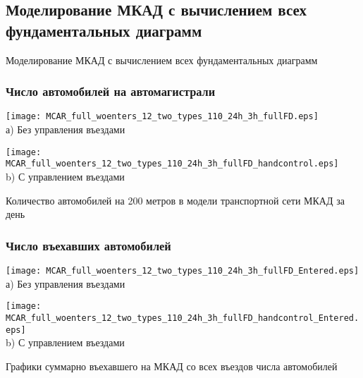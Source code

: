 \subsection{Моделирование МКАД с вычислением всех фундаментальных диаграмм}
\begin{frame}
    \begin{center}
        \Huge
        Моделирование МКАД с вычислением всех фундаментальных диаграмм
    \end{center}
\end{frame}
\begin{frame}
    \frametitle{Число автомобилей на автомагистрали}
    \centering
    \begin{minipage}[b]{0.49\textwidth}
        \centering
        \texttt{[image: MCAR\_full\_woenters\_12\_two\_types\_110\_24h\_3h\_fullFD.eps]}  \\ а) Без управления въездами
    \end{minipage}
    \hfill
    \begin{minipage}[b]{0.49\textwidth}
        \centering
        \texttt{[image: MCAR\_full\_woenters\_12\_two\_types\_110\_24h\_3h\_fullFD\_handcontrol.eps]}  \\ b) С управлением въездами
    \end{minipage}
    \hfill
    Количество автомобилей на 200 метров в модели транспортной сети МКАД за день
\end{frame}


\begin{frame}
    \frametitle{Число въехавших автомобилей}
    \centering
    \begin{minipage}[b]{.49\textwidth}
        \centering
        \texttt{[image: MCAR\_full\_woenters\_12\_two\_types\_110\_24h\_3h\_fullFD\_Entered.eps]}  \\ а) Без управления въездами
    \end{minipage}
    \hfill
    \begin{minipage}[b]{.49\textwidth}
        \centering
        \texttt{[image: MCAR\_full\_woenters\_12\_two\_types\_110\_24h\_3h\_fullFD\_handcontrol\_Entered.eps]}  \\ b) С управлением въездами
    \end{minipage}
    \hfill
    Графики суммарно въехавшего на МКАД со всех въездов числа автомобилей
\end{frame}


